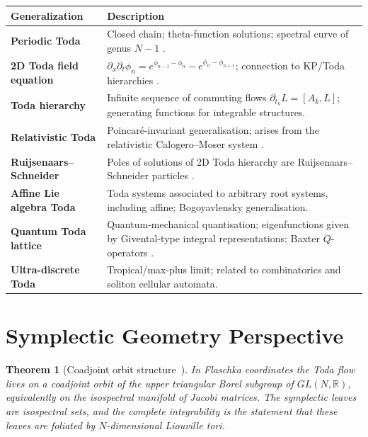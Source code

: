 \documentclass[12pt,a4paper]{article}
\newtheorem{theorem}{Theorem}[section]
\theoremstyle{definition}
\newcommand{\R}{\mathbb{R}}
\begin{document}
\medskip
\begin{center}
\renewcommand{\arraystretch}{1.4}
\begin{tabular}{>{\bfseries}p{4.5cm} p{9.5cm}}
\toprule
Generalization & Description \\
\midrule
Periodic Toda &
  Closed chain; theta-function solutions; spectral curve of genus $N-1$
  \cite{Teschl2000}. \\
2D Toda field equation &
  $\partial_x\partial_t\phi_n = e^{\phi_{n-1}-\phi_n}-e^{\phi_n-\phi_{n+1}}$;
  connection to KP/Toda hierarchies \cite{Toda1989}. \\
Toda hierarchy &
  Infinite sequence of commuting flows $\partial_{t_k}L=[A_k,L]$;
  generating functions for integrable structures. \\
Relativistic Toda &
  Poincar\'e-invariant generalisation; arises from the relativistic
  Calogero--Moser system \cite{Ruijsenaars1990}. \\
Ruijsenaars--Schneider &
  Poles of solutions of 2D Toda hierarchy are
  Ruijsenaars--Schneider particles \cite{RS1986}. \\
Affine Lie algebra Toda &
  Toda systems associated to arbitrary root systems, including affine;
  Bogoyavlensky generalisation. \\
Quantum Toda lattice &
  Quantum-mechanical quantisation; eigenfunctions given by
  Givental-type integral representations; Baxter $Q$-operators
  \cite{Givental1997}. \\
Ultra-discrete Toda &
  Tropical/max-plus limit; related to combinatorics and soliton cellular
  automata. \\
\bottomrule
\end{tabular}
\end{center}

\section{Symplectic Geometry Perspective}

\begin{theorem}[Coadjoint orbit structure~\cite{Deift1983}]
In Flaschka coordinates the Toda flow lives on a \emph{coadjoint orbit of
the upper triangular Borel subgroup} of $GL(N,\R)$, equivalently on the
isospectral manifold of Jacobi matrices.  The symplectic leaves are
isospectral sets, and the complete integrability is the statement that
these leaves are foliated by $N$-dimensional Liouville tori.
\end{theorem}
\end{document}
